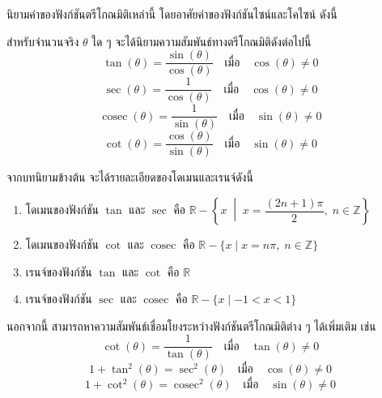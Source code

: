 \vspace{0.5em}
\noindent นิยามค่าของฟังก์ชันตรีโกณมิติเหล่านี้ โดยอาศัยค่าของฟังก์ชันไซน์และโคไซน์ ดังนี้

\begin{definitionbox}
	สำหรับจำนวนจริง $\theta$ ใด ๆ จะได้นิยามความสัมพันธ์ทางตรีโกณมิติดังต่อไปนี้
	$$\tan(\theta) = \dfrac{\sin(\theta)}{\cos(\theta)} \quad \text{เมื่อ} \quad \cos(\theta) \neq 0$$
	$$\sec(\theta) = \dfrac{1}{\cos(\theta)} \quad \text{เมื่อ} \quad \cos(\theta) \neq 0$$
	$$\operatorname{cosec}(\theta) = \dfrac{1}{\sin(\theta)} \quad \text{เมื่อ} \quad \sin(\theta) \neq 0$$
	$$\cot(\theta) = \dfrac{\cos(\theta)}{\sin(\theta)} \quad \text{เมื่อ} \quad \sin(\theta) \neq 0$$
\end{definitionbox}

\begin{remarkbox}
	จากบทนิยามข้างต้น จะได้รายละเอียดของโดเมนและเรนจ์ดังนี้
	\begin{enumerate}
		\item โดเมนของฟังก์ชัน $\tan$ และ $\sec$ คือ $\mathbb{R} - \left\{x \;\middle|\; x = \dfrac{(2n+1)\pi}{2}, \; n \in \mathbb{Z}\right\}$
		\item โดเมนของฟังก์ชัน $\cot$ และ $\operatorname{cosec}$ คือ $\mathbb{R} - \{x \mid x = n\pi, \; n \in \mathbb{Z}\}$
		\item เรนจ์ของฟังก์ชัน $\tan$ และ $\cot$ คือ $\mathbb{R}$
		\item เรนจ์ของฟังก์ชัน $\sec$ และ $\operatorname{cosec}$ คือ $\mathbb{R} - \{x \mid -1 < x < 1\}$
	\end{enumerate}
\end{remarkbox}

\begin{remarkbox}
	นอกจากนี้ สามารถหาความสัมพันธ์เชื่อมโยงระหว่างฟังก์ชันตรีโกณมิติต่าง ๆ ได้เพิ่มเติม เช่น
	$$\cot(\theta) = \dfrac{1}{\tan(\theta)} \quad \text{เมื่อ} \quad \tan(\theta) \neq 0$$
	$$1 + \tan^{2}(\theta) = \sec^{2}(\theta) \quad \text{เมื่อ} \quad \cos(\theta) \neq 0$$
	$$1 + \cot^{2}(\theta) = \operatorname{cosec}^{2}(\theta) \quad \text{เมื่อ} \quad \sin(\theta) \neq 0$$
\end{remarkbox}


